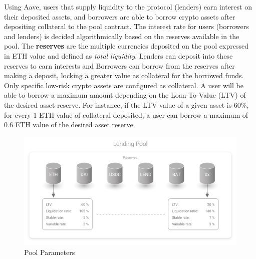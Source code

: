 \documentclass[11pt,a4paper]{report}
\begin{document}
Using Aave, users that supply liquidity to the protocol (lenders) earn interest on their deposited assets, and borrowers are able to borrow crypto assets after depositing collateral to the pool contract. The interest rate for users (borrowers and lenders) is decided algorithmically based on the reserves available in the pool. The \textbf{reserves} are the multiple currencies deposited on the pool expressed in ETH value and defined as \textit{total liquidity}. Lenders can deposit into these reserves to earn interests and Borrowers can borrow from the reserves after making a deposit, locking a greater value as collateral for the borrowed funds. Only specific low-risk crypto assets are configured as collateral. A user will be able to borrow a maximum amount depending on the Loan-To-Value (LTV) of the desired asset reserve. For instance, if the LTV value of a given asset is  60\%, for every 1 ETH value of collateral deposited, a user can borrow a maximum of 0.6 ETH value of the desired asset reserve.
\begin{figure}[htp]
	\centering
	\includegraphics[width=1\textwidth]{./images/lp_reserves}
	\caption{Pool Parameters\cite{aaveV1}}
	\label{fig:tvl}
\end{figure}
\end{document}
